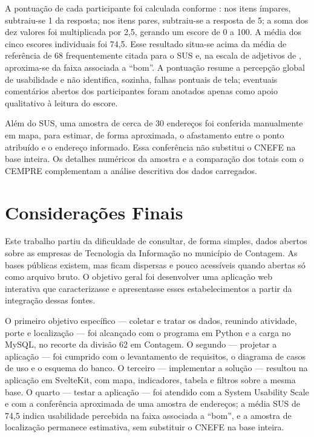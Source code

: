 \documentclass[a4paper,12pt]{article}
\begin{document}
A pontuação de cada participante foi calculada conforme : nos itens ímpares, subtraiu-se 1 da resposta; nos itens pares, subtraiu-se a resposta de 5; a soma dos dez valores foi multiplicada por 2,5, gerando um escore de 0 a 100.
A média dos cinco escores individuais foi 74,5.
Esse resultado situa-se acima da média de referência de 68 frequentemente citada para o SUS e, na escala de adjetivos de , aproxima-se da faixa associada a ``bom''.
A pontuação resume a percepção global de usabilidade e não identifica, sozinha, falhas pontuais de tela; eventuais comentários abertos dos participantes foram anotados apenas como apoio qualitativo à leitura do escore.

Além do SUS, uma amostra de cerca de 30 endereços foi conferida manualmente em mapa, para estimar, de forma aproximada, o afastamento entre o ponto atribuído e o endereço informado.
Essa conferência não substitui o CNEFE na base inteira.
Os detalhes numéricos da amostra e a comparação dos totais com o CEMPRE complementam a análise descritiva dos dados carregados.

\section{Considerações Finais}

Este trabalho partiu da dificuldade de consultar, de forma simples, dados abertos sobre as empresas de Tecnologia da Informação no município de Contagem.
As bases públicas existem, mas ficam dispersas e pouco acessíveis quando abertas só como arquivo bruto.
O objetivo geral foi desenvolver uma aplicação web interativa que caracterizasse e apresentasse esses estabelecimentos a partir da integração dessas fontes.

O primeiro objetivo específico --- coletar e tratar os dados, reunindo atividade, porte e localização --- foi alcançado com o programa em Python e a carga no MySQL, no recorte da divisão 62 em Contagem.
O segundo --- projetar a aplicação --- foi cumprido com o levantamento de requisitos, o diagrama de casos de uso e o esquema do banco.
O terceiro --- implementar a solução --- resultou na aplicação em SvelteKit, com mapa, indicadores, tabela e filtros sobre a mesma base.
O quarto --- testar a aplicação --- foi atendido com a System Usability Scale e com a conferência aproximada de uma amostra de endereços; a média SUS de 74,5 indica usabilidade percebida na faixa associada a ``bom'', e a amostra de localização permanece estimativa, sem substituir o CNEFE na base inteira.
\end{document}
